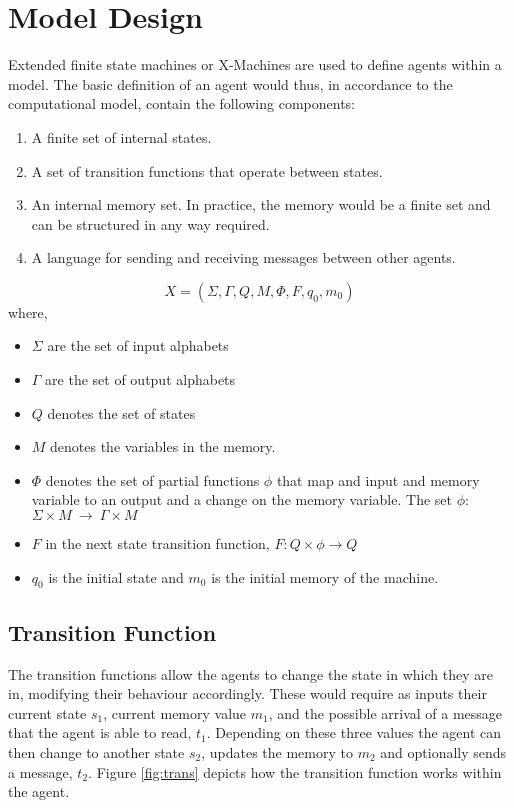 \section{Model Design}

Extended finite state machines or X-Machines are used to define agents within a
model. 
The basic definition of an
agent would thus, in accordance to the computational model, contain
the following components:
\begin{enumerate}
 \item A finite set of internal states.
 \item A set of transition functions that operate between states.
 \item An internal memory set. In practice, the memory would be a finite set and can be structured in any way required.
 \item A language for sending and receiving messages between other agents.
\end{enumerate}

\begin{equation}\label{streamxmachine}
    X = (\Sigma, \Gamma, Q, M, \Phi, F, q_{0}, m_{0})
\end{equation}
where,
\begin{itemize}
\item $\Sigma$ are the set of input alphabets
\item $\Gamma$ are the set of output alphabets
\item $Q$ denotes the set of states
\item $M$ denotes the variables in the memory.
\item $\Phi$ denotes the set of partial functions $\phi$ that map
and input and memory variable to an output and a change on the
memory variable. The set $\phi$: $\Sigma \times M\ \longrightarrow\
\Gamma\times M$
\item $F$ in the next state transition function, $F : Q \times\phi\longrightarrow
Q$
\item $q_{0}$ is the initial state and $m_{0}$ is the initial memory
of the machine.
\end{itemize}

\subsection{Transition Function}
The transition functions allow the agents to change the state in
which they are in, modifying their behaviour accordingly. These would
require as inputs their current state $s_{1}$, current memory value
$m_{1}$, and the possible arrival of a message that the agent is able to
read, $t_{1}$. Depending on these three values the agent can then
change to another state $s_{2}$, updates the memory to $m_{2}$ and
optionally sends a message, $t_{2}$. Figure
\ref{fig:trans} depicts how the transition function
works within the agent.


